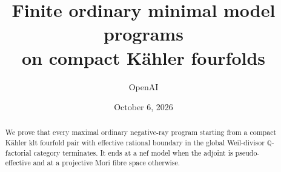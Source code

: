 \documentclass[11pt,reqno]{amsart}
\title[Minimal model programs on Kähler fourfolds]{Finite ordinary minimal model programs\\on compact Kähler fourfolds}
\author{OpenAI}
\date{October 6, 2026}
\theoremstyle{definition}
\theoremstyle{remark}
\numberwithin{equation}{section}
\newcommand{\Q}{\mathbb Q}
\begin{document}
\begin{abstract}
We prove that every maximal ordinary negative-ray program starting from a compact Kähler klt fourfold pair with effective rational boundary in the global Weil-divisor $\Q$-factorial category terminates. It ends at a nef model when the adjoint is pseudo-effective and at a projective Mori fibre space otherwise.
\end{abstract}
\maketitle
\tableofcontents













\appendix



\end{document}
